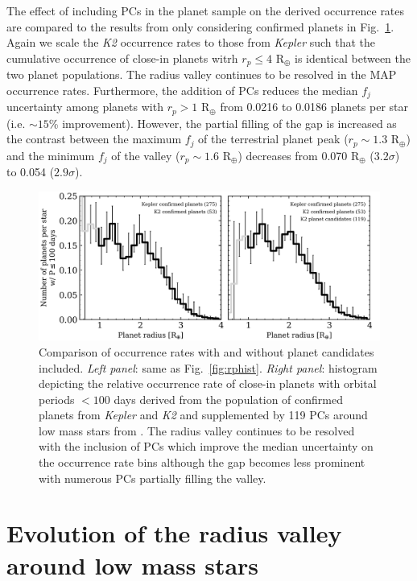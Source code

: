 \documentclass[twocolumn]{emulateapj}
\newcommand{\kepler}[1]{\emph{Kepler}#1}
\newcommand{\ktwo}[1]{\emph{K2}#1}
\begin{document}



The effect of including PCs in the planet sample on the derived occurrence rates are compared to the results
from only considering confirmed planets in Fig.~\ref{fig:rphistPCs}. Again we scale the \ktwo{} occurrence rates
to those from \kepler{} such that the cumulative occurrence of close-in planets witrh $r_p \leq 4$ R$_{\oplus}$
is identical between the two planet populations. The radius valley continues to be resolved in
the MAP occurrence rates. Furthermore, the addition of PCs reduces the median $f_j$ uncertainty among planets
with $r_p>1$ R$_{\oplus}$ from
0.0216 to 0.0186 planets per star (i.e. $\sim 15$\% improvement). However, the partial filling of the gap is
increased as the contrast between the maximum $f_j$ of the terrestrial planet peak ($r_p \sim 1.3$ R$_{\oplus}$)
and the minimum $f_j$ of the valley ($r_p \sim 1.6$ R$_{\oplus}$) decreases from 0.070 R$_{\oplus}$ ($3.2\sigma$)
to 0.054 ($2.9\sigma$).

\begin{figure}
  \centering
  \includegraphics[scale=.8]{figures/rphist_kruse.png}
  \caption{Comparison of occurrence rates with and without planet candidates included. \emph{Left panel}:
    same as Fig.~\ref{fig:rphist}. \emph{Right panel}: histogram depicting the relative occurrence
    rate of close-in planets with orbital periods $<100$ days derived from the population of confirmed
    planets from \kepler{} and \ktwo{} and supplemented by 119 PCs
    around low mass stars from \cite{kruse19}. The radius valley continues to be resolved with
    the inclusion of PCs which improve the median uncertainty on the occurrence rate bins although the
    gap becomes less prominent with numerous PCs partially filling the valley.}
  \label{fig:rphistPCs}
\end{figure}


\section{Evolution of the radius valley around low mass stars} \label{sect:models}
\end{document}
